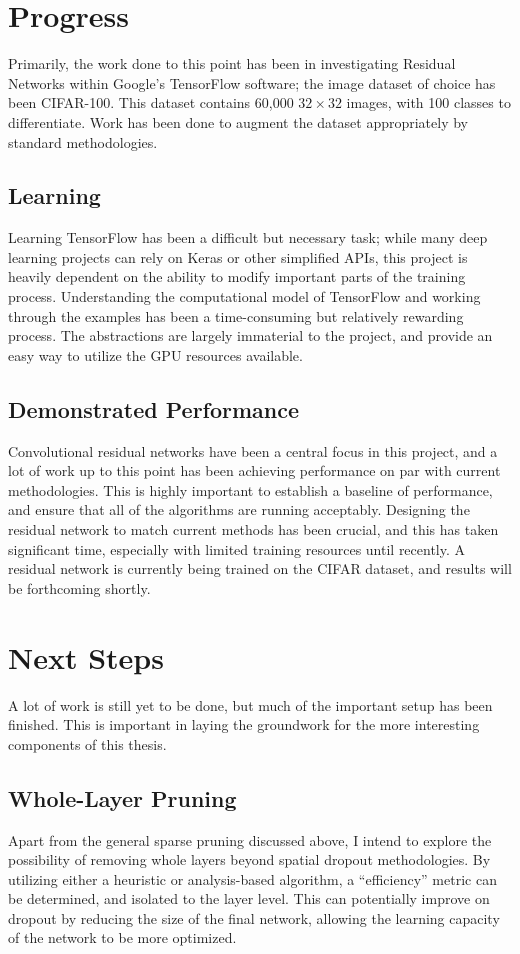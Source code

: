 \documentclass[12pt]{article}
\begin{document}
\section{Progress}
Primarily, the work done to this point has been in investigating Residual Networks within Google's TensorFlow software; the image dataset of choice has been CIFAR-100.
This dataset contains 60,000 $32\times32$ images, with 100 classes to differentiate.
Work has been done to augment the dataset appropriately by standard methodologies.

\subsection{Learning}
Learning TensorFlow has been a difficult but necessary task; while many deep learning projects can rely on Keras or other simplified APIs, this project is heavily dependent on the ability to modify important parts of the training process.
Understanding the computational model of TensorFlow and working through the examples has been a time-consuming but relatively rewarding process.
The abstractions are largely immaterial to the project, and provide an easy way to utilize the GPU resources available.

\subsection{Demonstrated Performance}
Convolutional residual networks have been a central focus in this project, and a lot of work up to this point has been achieving performance on par with current methodologies.
This is highly important to establish a baseline of performance, and ensure that all of the algorithms are running acceptably.
Designing the residual network to match current methods has been crucial, and this has taken significant time, especially with limited training resources until recently.
A residual network is currently being trained on the CIFAR dataset, and results will be forthcoming shortly.

\section{Next Steps}
A lot of work is still yet to be done, but much of the important setup has been finished.
This is important in laying the groundwork for the more interesting components of this thesis.

\subsection{Whole-Layer Pruning}
Apart from the general sparse pruning discussed above, I intend to explore the possibility of removing whole layers beyond spatial dropout methodologies.
By utilizing either a heuristic or analysis-based algorithm, a ``efficiency'' metric can be determined, and isolated to the layer level.
This can potentially improve on dropout by reducing the size of the final network, allowing the learning capacity of the network to be more optimized.
\end{document}
